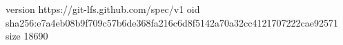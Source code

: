 version https://git-lfs.github.com/spec/v1
oid sha256:e7a4eb08b9f709c57b6de368fa216c6d8f5142a70a32cc4121707222cae92571
size 18690
